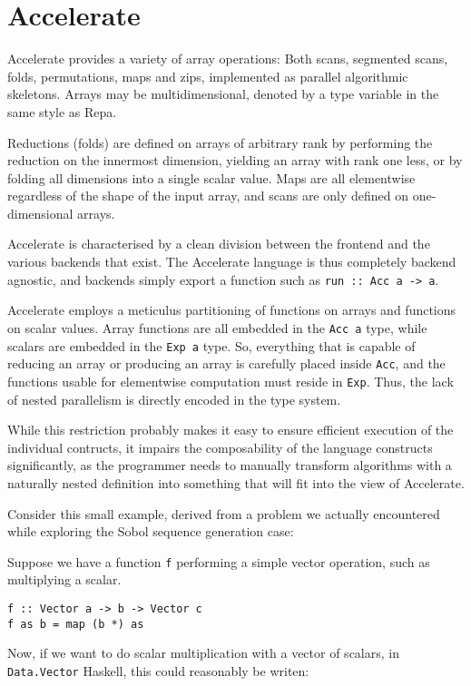 \section{Accelerate}
Accelerate provides a variety of array operations: Both scans,
segmented scans, folds, permutations, maps and zips, implemented as
parallel algorithmic skeletons. Arrays may be multidimensional,
denoted by a type variable in the same style as Repa.

Reductions (folds) are defined on arrays of arbitrary rank by
performing the reduction on the innermost dimension, yielding an array
with rank one less, or by folding all dimensions into a single scalar
value.  Maps are all elementwise regardless of the shape of the input
array, and scans are only defined on one-dimensional arrays.

Accelerate is characterised by a clean division between the frontend and the
various backends that exist. The Accelerate language is thus completely backend
agnostic, and backends simply export a function such as \hbox{\texttt{run :: Acc a ->
a}.}

Accelerate employs a meticulus partitioning of functions on arrays and functions
on scalar values. Array functions are all embedded in the \texttt{Acc a} type,
while scalars are embedded in the \texttt{Exp a} type. So, everything that is
capable of reducing an array or producing an array is carefully placed inside
\texttt{Acc}, and the functions usable for elementwise computation must
reside in \texttt{Exp}. Thus, the lack of nested parallelism is directly
encoded in the type system.

While this restriction probably makes it easy to ensure efficient execution of
the individual contructs, it impairs the composability of the language
constructs significantly, as the programmer needs to manually transform
algorithms with a naturally nested definition into something that will fit into
the view of Accelerate.

Consider this small example, derived from a problem we actually encountered
while exploring the Sobol sequence generation case:

Suppose we have a function \texttt{f} performing a simple vector operation,
such as multiplying a scalar.

\begin{verbatim}
f :: Vector a -> b -> Vector c
f as b = map (b *) as
\end{verbatim}

Now, if we want to do scalar multiplication with a vector of scalars, in
\texttt{Data.Vector} Haskell, this could reasonably be writen:

